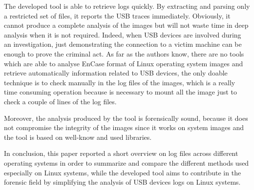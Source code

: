 \documentclass[a4paper]{article}
\begin{document}
The developed tool is able to retrieve logs quickly. By extracting and parsing
only a restricted set of files, it reports the USB traces immediately.
Obviously, it cannot produce a complete analysis of the images but will not
waste time in deep analysis when it is not required. Indeed, when USB devices
are involved during an investigation, just demonstrating the connection to a
victim machine can be enough to prove the criminal act. As far as the authors
know, there are no tools which are able to analyse EnCase format of Linux
operating system images and retrieve automatically information related to USB
devices, the only doable technique is to check manually in the log files of the
images, which is a really time consuming operation because is necessary to mount
all the image just to check a couple of lines of the log files.

Moreover, the analysis produced by the tool is forensically sound, because it
does not compromise the integrity of the images since it works on system
images and the tool is based on well-know and used libraries.

In conclusion, this paper reported a short overview on log files across
different operating systems in order to summarize and compare the different
methods used especially on Linux systems, while the developed tool aims to
contribute in the forensic field by simplifying the analysis of USB devices logs
on Linux systems.



\end{document}
